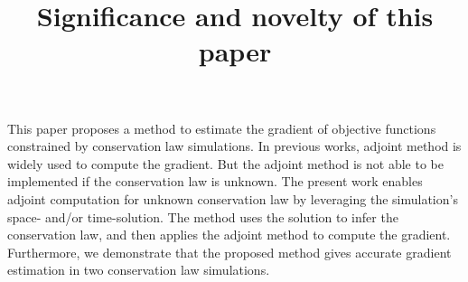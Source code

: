 \documentclass[a4paper,onecolumn]{article}
\begin{document}
\setcounter{page}{1}

\title{Significance and novelty of this paper}
\date{}
\maketitle
This paper proposes a method to estimate the gradient of objective functions 
constrained by conservation law simulations.
In previous works, adjoint method is widely used to compute the gradient.
But the adjoint method is not able to be implemented if the conservation law is unknown.
The present work enables adjoint computation for unknown conservation law by
leveraging the simulation's space- and/or time-solution. 
The method uses the solution to infer the conservation law, and then applies the adjoint method
to compute the gradient.
Furthermore, we demonstrate that the proposed method gives accurate
gradient estimation in two conservation law simulations.
\end{document}

